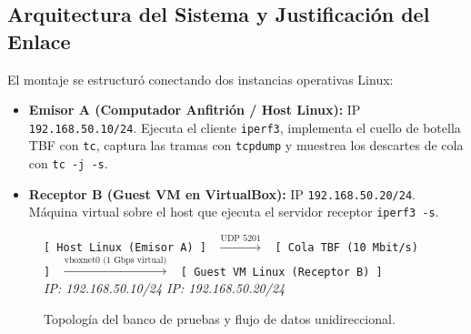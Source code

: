 \documentclass[11pt,a4paper]{article}
\begin{document}
\subsection{Arquitectura del Sistema y Justificación del Enlace}
El montaje se estructuró conectando dos instancias operativas Linux:
\begin{itemize}
    \item \textbf{Emisor A (Computador Anfitrión / Host Linux):} IP \texttt{192.168.50.10/24}. Ejecuta el cliente \texttt{iperf3}, implementa el cuello de botella TBF con \texttt{tc}, captura las tramas con \texttt{tcpdump} y muestrea los descartes de cola con \texttt{tc -j -s}.
    \item \textbf{Receptor B (Guest VM en VirtualBox):} IP \texttt{192.168.50.20/24}. Máquina virtual sobre el host que ejecuta el servidor receptor \texttt{iperf3 -s}.
\end{itemize}

\begin{figure}[H]
    \centering
    \begin{tcolorbox}[colback=gray!5,colframe=blue!60!black,title=\textbf{Diagrama Lógico del Montaje Experimental}]
    \centering
    \texttt{[ Host Linux (Emisor A) ]} \ $\xrightarrow{\text{UDP 5201}}$ \ \texttt{[ Cola TBF (10 Mbit/s) ]} \ $\xrightarrow{\text{vboxnet0 (1 Gbps virtual)}}$ \ \texttt{[ Guest VM Linux (Receptor B) ]} \\
    \footnotesize \textit{IP: 192.168.50.10/24 \hspace{6.0cm} IP: 192.168.50.20/24}
    \end{tcolorbox}
    \caption{Topología del banco de pruebas y flujo de datos unidireccional.}
    \label{fig:topologia}
\end{figure}
\end{document}
